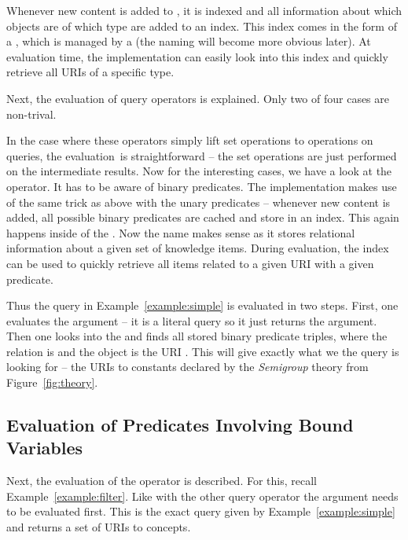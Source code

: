 Whenever new content is added to \mmt, it is indexed and all information about which objects are of which type are added to an index. 
This index comes in the form of a , which is managed by a  (the naming will become more obvious later).
At evaluation time, the implementation can easily look into this index and quickly retrieve all URIs of a specific type. 

Next, the evaluation of query operators is explained. 
Only two of four cases are non-trival. 

In the case where these operators simply lift set operations to operations on queries, the evaluation is straightforward -- the set operations are just performed on the intermediate results.
Now for the interesting cases, we have a look at the  operator.
It has to be aware of binary predicates.
The implementation makes use of the same trick as above with the unary predicates -- whenever new content is added, all possible binary predicates are cached and store in an index. 
This again happens inside of the . 
Now the name makes sense as it stores relational information about a given set of knowledge items.
During evaluation, the index can be used to quickly retrieve all items related to a given URI with a given predicate.

Thus the query in Example~\ref{example:simple} is evaluated in two steps. 
First, one evaluates the argument  -- it is a literal query so it just returns the argument. 
Then one looks into the  and finds all stored binary predicate triples, where the relation is  and the object is the URI . 
This will give exactly what we the query is looking for -- the URIs to constants declared by the \textit{Semigroup} theory from Figure~\ref{fig:theory}.

\subsection{Evaluation of Predicates Involving Bound Variables}\label{sec:qmt:boundeval}

Next, the evaluation of the  operator is described. 
For this, recall Example~\ref{example:filter}. 
Like with the other query operator the argument needs to be evaluated first. 
This is the exact query given by Example~\ref{example:simple} and returns a set of URIs to concepts. 

